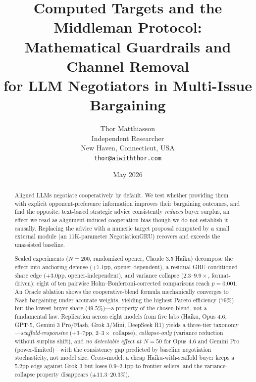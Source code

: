 \documentclass[11pt,a4paper]{article}
\title{%
  Computed Targets and the Middleman Protocol:\\
  Mathematical Guardrails and Channel Removal\\
  for LLM Negotiators in Multi-Issue Bargaining%
}
\author{%
  Thor Matthiasson\\
  Independent Researcher\\
  New Haven, Connecticut, USA\\
  \texttt{thor@aiwiththor.com}
}
\date{May 2026}
\begin{document}
\maketitle

\begin{abstract}
Aligned LLMs negotiate cooperatively by default. We test whether providing them with explicit opponent-preference information improves their bargaining outcomes, and find the opposite: text-based strategic advice consistently \emph{reduces} buyer surplus, an effect we read as alignment-induced cooperation bias though we do not establish it causally. Replacing the advice with a numeric target proposal computed by a small external module (an 11K-parameter NegotiationGRU) recovers and exceeds the unassisted baseline.

Scaled experiments ($N\!=\!200$, randomized opener, Claude 3.5 Haiku) decompose the effect into anchoring defense ($+7.1$pp, opener-dependent), a residual GRU-conditioned share edge ($+3.0$pp, opener-independent), and variance collapse ($2.3$--$9.9\times$, format-driven); eight of ten pairwise Holm--Bonferroni-corrected comparisons reach $p\!=\!0.001$. An Oracle ablation shows the cooperative-blend formula mechanically converges to Nash bargaining under accurate weights, yielding the highest Pareto efficiency ($79\%$) but the lowest buyer share ($49.5\%$)---a property of the chosen blend, not a fundamental law. Replication across eight models from five labs (Haiku, Opus 4.6, GPT-5, Gemini 3 Pro/Flash, Grok 3/Mini, DeepSeek R1) yields a three-tier taxonomy---\emph{scaffold-responsive} ($+3$--$7$pp, $2$--$3\times$ collapse), \emph{collapse-only} (variance reduction without surplus shift), and \emph{no detectable effect at $N\!=\!50$} for Opus 4.6 and Gemini Pro (power-limited)---with the consistency gap predicted by baseline negotiation stochasticity, not model size. Cross-model: a cheap Haiku-with-scaffold buyer keeps a $5.2$pp edge against Grok 3 but loses $0.9$--$2.1$pp to frontier sellers, and the variance-collapse property disappears ($\pm 11.3$--$20.3\%$).


\end{abstract}
\end{document}
